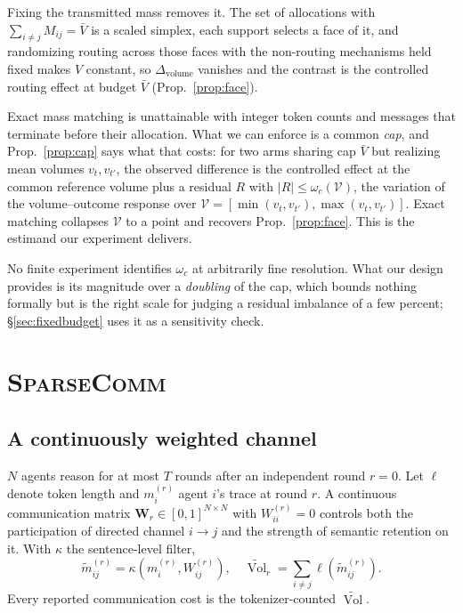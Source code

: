 \documentclass[11pt]{article}
\newcommand{\sys}{\textsc{SparseComm}\xspace}
\newcommand{\Vol}{\operatorname{Vol}}
\newcommand{\Volt}{\widetilde{\Vol}}
\begin{document}
Fixing the transmitted mass removes it. The set of allocations with
$\sum_{i\neq j}M_{ij}=\bar V$ is a scaled simplex, each support selects a face
of it, and randomizing routing across those faces with the non-routing
mechanisms held fixed makes $V$ constant, so $\Delta_{\mathrm{volume}}$ vanishes
and the contrast is the controlled routing effect at budget $\bar V$
(Prop.~\ref{prop:face}).


Exact mass matching is unattainable with integer token counts and messages that
terminate before their allocation. What we can enforce is a common \emph{cap},
and Prop.~\ref{prop:cap} says what that costs: for two arms sharing cap
$\bar V$ but realizing mean volumes $v_t,v_{t'}$, the observed difference is the
controlled effect at the common reference volume plus a residual $R$ with
$|R|\le\omega_c(\mathcal V)$, the variation of the volume--outcome response over
$\mathcal V=[\min(v_t,v_{t'}),\max(v_t,v_{t'})]$. Exact matching collapses
$\mathcal V$ to a point and recovers Prop.~\ref{prop:face}. This is the estimand
our experiment delivers.


No finite experiment identifies $\omega_c$ at arbitrarily fine resolution. What
our design provides is its magnitude over a \emph{doubling} of the cap, which
bounds nothing formally but is the right scale for judging a residual imbalance
of a few percent; \S\ref{sec:fixedbudget} uses it as a sensitivity check.

\section{\sys}
\label{sec:method}

\subsection{A continuously weighted channel}
\label{sec:channel}

$N$ agents reason for at most $T$ rounds after an independent round $r=0$. Let
$\ell$ denote token length and $m_i^{(r)}$ agent $i$'s trace at round $r$. A
continuous communication matrix $\mathbf{W}_r\in[0,1]^{N\times N}$ with
$W^{(r)}_{ii}=0$ controls both the participation of directed channel $i\to j$
and the strength of semantic retention on it. With $\kappa$ the sentence-level filter,
\begin{equation}
\widetilde m^{(r)}_{ij}
=\kappa\!\left(m_i^{(r)},W^{(r)}_{ij}\right),\quad
\Volt_r=\sum_{i\neq j}\ell\!\left(\widetilde m^{(r)}_{ij}\right).
\label{eq:vol}
\end{equation}
Every reported communication cost is the tokenizer-counted $\Volt$.
\end{document}

